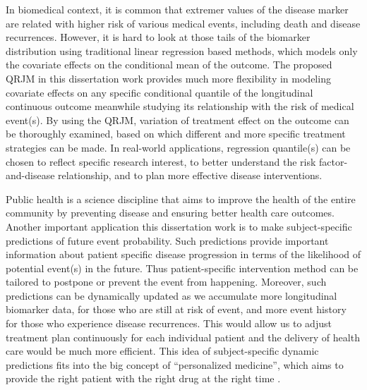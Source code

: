 In biomedical context, it is common that extremer values of the disease marker are related with higher risk of various medical events, including death and disease recurrences. However, it is hard to look at those tails of the biomarker distribution using traditional linear regression based methods, which models only the covariate effects on the conditional mean of the outcome. The proposed QRJM in this dissertation work provides much more flexibility in modeling covariate effects on any specific conditional quantile of the longitudinal continuous outcome meanwhile studying its relationship with the risk of medical event(s). By using the QRJM, variation of treatment effect on the outcome can be thoroughly examined, based on which different and more specific treatment strategies can be made. In real-world applications, regression quantile(s) can be chosen to reflect specific research interest, to better understand the risk factor-and-disease relationship, and to plan more effective disease interventions.

Public health is a science discipline that aims to improve the health of the entire community by preventing disease and ensuring better health care outcomes. Another important application this dissertation work is to make subject-specific predictions of future event probability. Such predictions provide important information about patient specific disease progression in terms of the likelihood of potential event(s) in the future. Thus patient-specific intervention method can be tailored to postpone or prevent the event from happening. Moreover, such predictions can be dynamically updated as we accumulate more longitudinal biomarker data, for those who are still at risk of event, and more event history for those who experience disease recurrences. This would allow us to adjust treatment plan continuously for each individual patient and the delivery of health care would be much more efficient. This idea of subject-specific dynamic predictions fits into the big concept of ``personalized medicine'', which aims to provide the right patient with the right drug at the right time \citep{us2013paving}.



